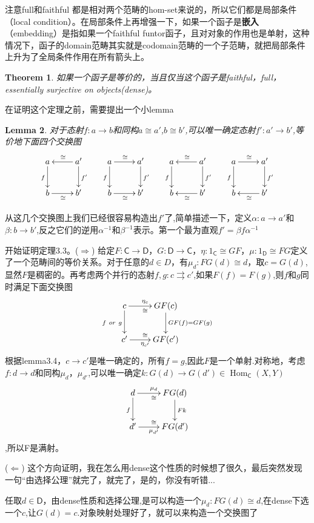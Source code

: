 \documentclass{article}
\newtheorem{theorem}{Theorem}[section]
\newtheorem{lemma}[theorem]{Lemma}
\newcommand{\tbf}{\textbf}
\newcommand*{\cat}[1]{\textsf{#1}\xspace}
\newcommand{\al}{\alpha}
\newcommand{\be}{\beta}
\newcommand*{\xfunc}[4]{{#2}\colon{#3}{#1}{#4}}
\newcommand*{\func}[3]{\xfunc{\to}{#1}{#2}{#3}}
\newcommand*{\pfunc}[3]{\xfunc{\rightrightarrows}{#1}{#2}{#3}}
\newcommand*{\isom}[3]{\xfunc{\cong}{#1}{#2}{#3}}
\DeclareMathOperator{\Hom}{Hom}
\begin{document}
注意full和faithful 都是相对两个范畴的hom-set来说的，所以它们都是局部条件（local condition）。在局部条件上再增强一下，如果一个函子是\tbf{嵌入}（embedding）是指如果一个faithful funtor函子，且对对象的作用也是单射，这种情况下，函子的domain范畴其实就是codomain范畴的一个子范畴，就把局部条件上升为了全局条件作用在所有箭头上。

\begin{theorem}
\rm 如果一个函子是等价的，当且仅当这个函子是faithful，full，essentially surjective on objects(dense)。
\end{theorem}

在证明这个定理之前，需要提出一个小lemma

\begin{lemma}
\rm 对于态射$\func{f}{a}{b}$和同构$a \cong a'$,$b \cong b'$,可以唯一确定态射$\func{f'}{a'}{b'}$,等价地下面四个交换图
\[\xymatrix{
	a\ar[d]_{f} & a'\ar[l]_{\cong}\ar[d]^{f'} &
	a\ar[d]_{f}\ar[r]^{\cong} & a'\ar[d]^{f'} &
	a\ar[d]_{f} & a'\ar[l]_{\cong}\ar[d]^{f'} &
	a\ar[d]_{f}\ar[r]^{\cong} & a'\ar[d]^{f'} \\
	b\ar[r]_{\cong} & b' &
	b\ar[r]_{\cong} & b' &
	b & b'\ar[l]^{\cong} &
	b & b'\ar[l]^{\cong}
	}\]
\end{lemma}
从这几个交换图上我们已经很容易构造出$f'$了,简单描述一下，定义$\func{\al}{a}{a'}$和$\func{\be}{b}{b'}$,反之它们的逆用$\al^{-1}$和$\be^{-1}$表示。第一个最为直观$f'=\be f \al^{-1}$

开始证明定理3.3。($\Longrightarrow$) 给定$\func{F}{\cat{C}}{\cat{D}}$，$\func{G}{\cat{D}}{\cat{C}}$，$\isom{\eta}{1_{\cat{C}}}{GF}$，$\isom{\mu}{1_{\cat{D}}}{FG}$定义了一个范畴间的等价关系。对于任意的$d \in D$，有$\isom{\mu_d}{FG(d)}{d}$，取$c=G(d)$,显然$F$是稠密的。再考虑两个并行的态射$\pfunc{f,g}{c}{c'}$,如果$F(f)=F(g)$,则$f$和$g$同时满足下面交换图
\[\xymatrix{
	c\ar[d]_{f\ or\ g}\ar[r]_{\cong}^{\eta_c} & GF(c)\ar[d]^{GF(f)=GF(g)}\\
	c'\ar[r]_{\eta_{c'}}^{\cong} & GF(c')
	}\]	根据lemma3.4，$c \rightarrow c'$是唯一确定的，所有$f=g$,因此$F$是一个单射.对称地，考虑$\func{f}{d}{d}$和同构$\mu_{d}$，$\mu_{d'}$,可以唯一确定$\func{k}{G(d)}{G(d')} \in \Hom_\cat{C}(X,Y) $\[\xymatrix{
	d\ar[d]_{f}\ar[r]_{\cong}^{\mu_d} & FG(d)\ar[d]^{Fk}\\
	d'\ar[r]_{\mu_{d'}}^{\cong} & FG(d')
	}\],所以F是满射。
	
($\Longleftarrow$) 这个方向证明，我在怎么用dense这个性质的时候想了很久，最后突然发现一句“由选择公理”就完了，就完了，是的，你没有听错...

任取$d \in \cat{D}$，由dense性质和选择公理,是可以构造一个$\isom{\mu_d}{FG(d)}{d}$,在dense下选一个$c$,让$G(d)=c$.对象映射处理好了，就可以来构造一个交换图了
		
\end{document}
